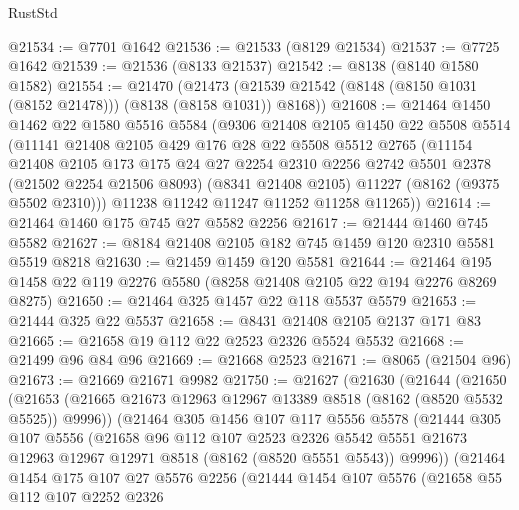 \begin{lexlean}{RustStd}
\begin{coremodule}
@21534 := @7701 @1642
@21536 := @21533 (@8129 @21534)
@21537 := @7725 @1642
@21539 := @21536 (@8133 @21537)
@21542 := @8138 (@8140 @1580 @1582)
@21554 := @21470
    (@21473 (@21539 @21542 (@8148 (@8150 @1031 (@8152 @21478))) (@8138 (@8158 @1031)) @8168))
@21608 := @21464
    @1450
    @1462
    @22
    @1580
    @5516
    @5584
    (@9306
      @21408
      @2105
      @1450
      @22
      @5508
      @5514
      (@11141
        @21408
        @2105
        @429
        @176
        @28
        @22
        @5508
        @5512
        @2765
        (@11154
          @21408
          @2105
          @173
          @175
          @24
          @27
          @2254
          @2310
          @2256
          @2742
          @5501
          @2378
          (@21502 @2254 @21506 @8093)
          (@8341 @21408 @2105)
          @11227
          (@8162 (@9375 @5502 @2310)))
        @11238
        @11242
        @11247
        @11252
        @11258
        @11265))
@21614 := @21464 @1460 @175 @745 @27 @5582 @2256
@21617 := @21444 @1460 @745 @5582
@21627 := @8184 @21408 @2105 @182 @745 @1459 @120 @2310 @5581 @5519 @8218
@21630 := @21459 @1459 @120 @5581
@21644 := @21464 @195 @1458 @22 @119 @2276 @5580 (@8258 @21408 @2105 @22 @194 @2276 @8269 @8275)
@21650 := @21464 @325 @1457 @22 @118 @5537 @5579
@21653 := @21444 @325 @22 @5537
@21658 := @8431 @21408 @2105 @2137 @171 @83
@21665 := @21658 @19 @112 @22 @2523 @2326 @5524 @5532
@21668 := @21499 @96 @84 @96
@21669 := @21668 @2523
@21671 := @8065 (@21504 @96)
@21673 := @21669 @21671 @9982
@21750 := @21627
    (@21630
      (@21644
        (@21650
          (@21653 (@21665 @21673 @12963 @12967 @13389 @8518 (@8162 (@8520 @5532 @5525)) @9996))
          (@21464
            @305
            @1456
            @107
            @117
            @5556
            @5578
            (@21444
              @305
              @107
              @5556
              (@21658
                @96
                @112
                @107
                @2523
                @2326
                @5542
                @5551
                @21673
                @12963
                @12967
                @12971
                @8518
                (@8162 (@8520 @5551 @5543))
                @9996))
            (@21464
              @1454
              @175
              @107
              @27
              @5576
              @2256
              (@21444
                @1454
                @107
                @5576
                (@21658
                  @55
                  @112
                  @107
                  @2252
                  @2326

\end{coremodule}
\end{lexlean}
